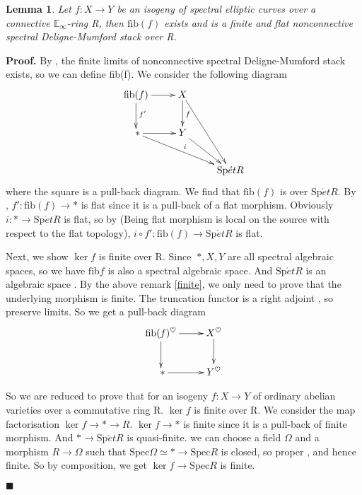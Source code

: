\documentclass[12pt]{article}
\newtheorem{lemma}[theorem]{Lemma}
\theoremstyle{thry}
\renewenvironment{proof}
{\par \noindent \textbf{Proof.}}
{ \par \hfill $\blacksquare$ \quad \par }
\def  \fib      {\mathrm{fib}}
\def  \Spec     {\mathrm{Spec}}
\def  \Spet     {\mathrm{Sp}\acute{e}t}
\def  \be       {\mathbb{E}}
\begin{document}
\begin{lemma}
	Let $f: X \to Y$ be an isogeny of spectral elliptic curves over a connective $\be_{\infty}$-ring R, then $\mathrm{fib}(f)$ exists and  is a finite and  flat  nonconnective spectral Deligne-Mumford stack over R. 
\end{lemma}
\begin{proof}
	By \cite[Proposition 1.14.1.1]{lu-SAG}, the finite limits of nonconnective spectral Deligne-Mumford stack exists, so we can define fib(f). We consider the following diagram
	$$
	\xymatrix{
	\fib(f) \ar[r]  \ar[d]^{f'}  &  X \ar[d]^{f}  \ar[rdd]  &  \\
	\ *       \ar[r]   \ar[rrd]^{i}  &  Y   \ar[rd]    &   \\
	                    &                 &   \Spet R  \\
	}
	$$
	where the square is a pull-back diagram. We find that $\fib(f)$ is  over $\Spet R$. By \cite[Remark 2.8.2.6]{lu-SAG}, $f': \fib(f) \to *$ is flat since it is a pull-back of  a flat morphism. Obviously $i: * \to \Spet R$ is flat, so by \cite[Example 2.8.3.12]{lu-SAG} (Being flat morphism is local on the source with respect  to the flat topology), $i \circ f' : \fib(f) \to \Spet R$ is flat. 
	
	Next, we show $\ker f$  is finite over R.  Since $\ *,X,Y$ are all spectral algebraic spaces, so we have $\fib f$ is also a spectral algebraic space.  And $\Spet R$ is an algebraic space \cite[Example 1.6.8.2]{lu-SAG}. By the above remark \ref{finite}, we only need to prove that  the underlying morphism  is finite.  The truncation functor is a right adjoint , so preserve limits. So we get a  pull-back diagram
	$$
	\xymatrix{
	\fib(f)^{\heartsuit} \ar[r]  \ar[d]  &  X^{\heartsuit}  \ar[d]   \\
   \ *   \ar[r]                    &    Y^{\heartsuit} \\
	}
	$$ 
	
	So we are reduced to prove that for an isogeny  $f: X \to Y$ of ordinary abelian varieties over a  commutative  ring R. $\ker f$ is finite over R.   We consider the map factorisation $\ker f \to * \to R$.  $\ker f \to *$ is finite since it is a pull-back of finite morphism. And $* \to \Spet R$ is quasi-finite. we can choose a field $\Omega$ and a morphism $R \to \Omega$ such that $\Spec \Omega  \simeq * \to  \Spec R$ is closed, so proper , and hence finite. So by composition, we get $\ker f \to \Spec R$ is finite.
	 
\end{proof}
\end{document}

